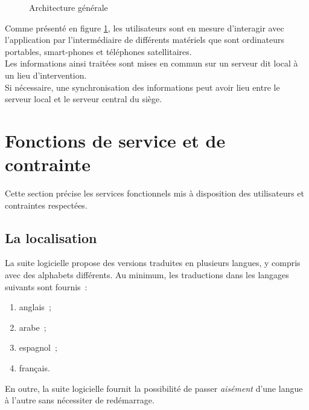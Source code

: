 \begin{figure}[htbp]
	\caption{Architecture générale}
	\label{ArchitecturePhysique}
\end{figure}

Comme présenté en figure \ref{ArchitecturePhysique}, les utilisateurs sont en mesure d'interagir avec l'application par l'intermédiaire de différents matériels que sont ordinateurs portables, smart-phones et téléphones satellitaires.
\\
Les informations ainsi traitées sont mises en commun sur un serveur dit \og local \fg{} à un lieu d'intervention.
\\
Si nécessaire, une synchronisation des informations peut avoir lieu entre le serveur \og local \fg{} et le serveur \og central \fg{} du siège.

\section{Fonctions de service et de contrainte}
Cette section précise les services fonctionnels mis à disposition des utilisateurs et contraintes respectées.

\subsection{La localisation}
La suite logicielle propose des versions traduites en plusieurs langues, y compris avec des alphabets différents. Au minimum, les traductions dans les langages suivants sont fournis~:
\begin{enumerate}[label=$\bullet$]
	\item anglais~;
	\item arabe~;
	\item espagnol~;
	\item français.
\end{enumerate}
En outre, la suite logicielle fournit la possibilité de passer \emph{aisément} d'une langue à l'autre sans nécessiter de redémarrage.

